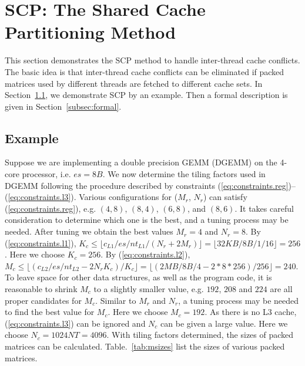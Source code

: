 \section{SCP: The Shared Cache Partitioning Method}\label{sec:scp}

This section demonstrates the SCP method to handle inter-thread cache conflicts.
The basic idea is that inter-thread cache conflicts can be eliminated
if packed matrices used by different threads are fetched to different cache sets.
In Section~\ref{subsec:example}, we demonstrate SCP by an example.
Then a formal description is given in Section~\ref{subsec:formal}.

\subsection{Example}\label{subsec:example}

Suppose we are implementing a double precision GEMM (DGEMM) on
the 4-core processor, i.e. $es=8B$.
We now determine the tiling factors used in DGEMM following the procedure described
by constraints (\ref{eq:constraints.reg})--(\ref{eq:constraints.l3}).
Various configurations for ($M_r$, $N_r$) can satisfy (\ref{eq:constraints.reg}),
e.g. $(4,8)$, $(8,4)$, $(6,8)$, and $(8,6)$. 
It takes careful consideration to determine which one is the best,
and a tuning process may be needed.
After tuning we obtain the best values $M_r = 4$ and $N_r = 8$.
By (\ref{eq:constraints.l1}),
$K_c \le \lfloor c_{L1}/es/nt_{L1}/(N_r + 2 M_r) \rfloor = \lfloor 32KB/8B/1/16 \rfloor = 256$.
Here we choose $K_c=256$.
By (\ref{eq:constraints.l2}),
$M_c \le \lfloor (c_{L2}/es/nt_{L2} - 2 N_r K_c )/ K_c \rfloor =
\lfloor (2MB/8B/4 - 2*8*256)/256 \rfloor = 240$.
To leave space for other data structures, as well as the program code,
it is reasonable to shrink $M_c$ to a slightly smaller value,
e.g. $192$, $208$ and $224$ are all proper candidates for $M_c$.
Similar to $M_r$ and $N_r$, a tuning process may be needed to
find the best value for $M_c$.
Here we choose $M_c = 192$.
As there is no L3 cache, (\ref{eq:constraints.l3}) can be ignored
and $N_c$ can be given a large value.
Here we choose $N_c = 1024NT = 4096$.
With tiling factors determined, the sizes of packed matrices
can be calculated. Table.~\ref{tab:msizes} list the sizes of
various packed matrices.

